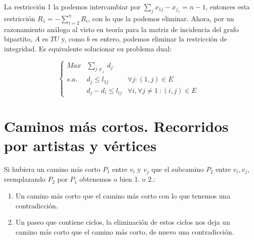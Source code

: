 \documentclass[openany]{book}
\begin{document}
\begin{exercise}
    La restricción 1 la podemos intercambiar por $ \sum\limits_{j}^{}x_{1j}-x_{j_1} = n-1 $, entonces esta restricción $ R_1 = - \sum\limits_{i=2}^{n} R_i $, con lo que la podemos eliminar. Ahora, por un razonamiento análogo al visto en teoría para la matriz de incidencia del grafo bipartito, $ A $ es $ TU $ y, como $ b $ es entero, podemos eliminar la restricción de integridad. Es equivalente solucionar su problema dual:

    $$ \left\{
    \begin{array}{llr}
        Max & \sum\limits_{j\ne_1}^{}d_j\\
        s.a. & d_j \leq l_{1j} & \forall j:(1,j) \in E\\
        & d_j-d_i \leq l_{ij} & \forall i, \forall j \ne 1\ : (i,j) \in E
    \end{array}
    \right. $$
    

\end{exercise}


\chapter{Caminos más cortos. Recorridos por artistas y vértices}





\begin{demonstration}
    Si hubiera un camino más corto $ P_1 $ entre $ v_i $ y $ v_j $ que el subcamino $ P_2 $ entre $ v_i,v_j $, reemplazando $ P_2 $ por $ P_1 $ obtenemos o bien 1. o 2.:
    \begin{enumerate}
        \item Un camino más corto que el camino más corto con lo que tenemos una contradicción.
        \item Un paseo que contiene ciclos, la eliminación de estos ciclos nos deja un camino más corto que el camino más corto, de nuevo una contradicción.
    \end{enumerate}
\end{demonstration}

\end{document}

